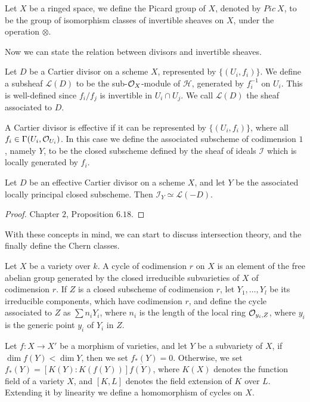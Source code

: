 \documentclass[
	oldfontcommands,
	sumario=abnt-6027-2012,
	12pt,			%
	openright,		%
	oneside,		%
	a4paper,		%
	english,		%
	brazil			%
	]{imecc-unicamp}
\begin{document}
\begin{definition}
	Let $X$ be a ringed space, we define the Picard group of $X$, denoted by $Pic~X$, to be the group of isomorphism classes of invertible sheaves on $X$, under the operation $\otimes $. 
\end{definition}
Now we can state the relation between divisors and invertible sheaves.
\begin{definition}
	Let $D$ be a Cartier divisor on a scheme $X$, represented by $\{(U_i,f_i)\}$. We define a subsheaf $\mathcal L(D)$ to be the sub-${\mathcal O}_X$-module of $\mathcal H$, generated by $f_i^{-1}$ on $U_i$. This is well-defined since $f_i/f_j$ is invertible in $U_i\cap U_j$. We call $\mathcal L(D)$ the sheaf associated to $D$. 
\end{definition}
\begin{definition}
	A Cartier divisor is effective if it can be represented by $\{(U_i,f_i) \}$, where all $f_i\in\Gamma(U_i,{\mathcal O}_{U_i})$. In this case we define the associated subscheme of codimension $1$, namely $Y$, to be the closed subscheme defined by the sheaf of ideals $\mathcal I$ which is locally generated by $f_i$.
\end{definition}
\begin{proposition}
	Let $D$ be an effective Cartier divisor on a scheme $X$, and let $Y$ be the associated locally principal closed subscheme. Then $\mathcal I_Y\simeq\mathcal L(-D)$.
\end{proposition}
\begin{proof}
	\cite{hartshorne1977algebraic} Chapter $2$, Proposition $6.18$.
\end{proof}



With these concepts in mind, we can start to discuss intersection theory, and the finally define the Chern classes.

Let $X$ be a variety over $k$. A cycle of codimension $r$ on $X$ is an element of the free abelian group generated by the closed irreducible subvarieties of $X$ of codimension $r$. If $Z$ is a closed subscheme of codimension $r$, let $Y_1,\dots,Y_l$ be its irreducible components, which have codimension $r$, and define the cycle associated to $Z$ as $\sum n_iY_i$, where $n_i$ is the length of the local ring ${\mathcal O}_{y_i,Z}$, where $y_i$ is the generic point $y_i$ of $Y_i$ in $Z$.

Let $f:X\rightarrow X'$ be a morphism of varieties, and let $Y$ be a subvariety of $X$, if $\dim f(Y)<\dim Y$, then we set $f_*(Y)=0$. Otherwise, we set $f_*(Y)=[K(Y):K(f(Y))] \overline{f(Y)}$, where $K(X)$ denotes the function field of a variety $X$, and $[K,L]$ denotes the field extension of $K$ over $L$. Extending it by linearity we define a homomorphism of cycles on $X$.
\end{document}
